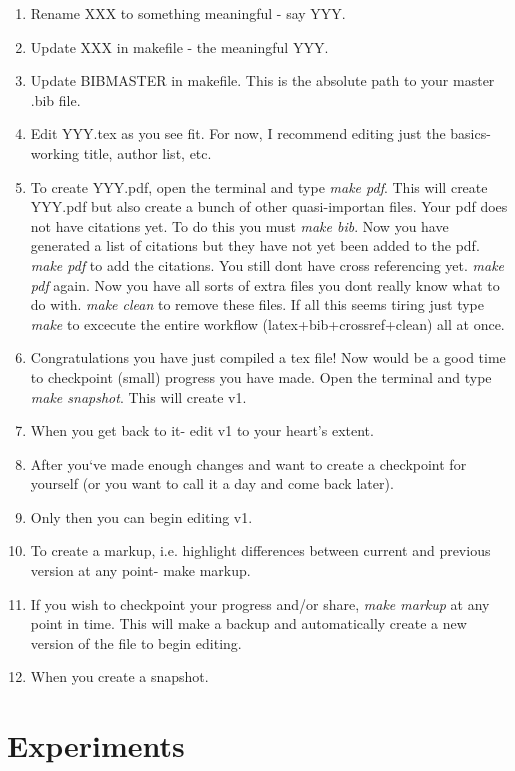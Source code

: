 \documentclass[preprint]{elsarticle}
\begin{document}
\begin{enumerate}[(1)]
\item Rename XXX to something meaningful - say YYY.
\item Update XXX in makefile - the meaningful YYY.
\item Update BIBMASTER in makefile. This is the absolute path to your master .bib file.
\item Edit YYY.tex as you see fit. For now, I recommend editing just the basics- working title, author list, etc.
\item To create YYY.pdf, open the terminal and type \emph{make pdf}. This will create YYY.pdf but also create a bunch of other quasi-importan files. Your pdf does not have citations yet. To do this you must \emph{make bib}. Now you have generated a list of citations but they have not yet been added to the pdf. \emph{make pdf} to add the citations. You still dont have cross referencing yet. \emph{make pdf} again. Now you have all sorts of extra files you dont really know what to do with. \emph{make clean} to remove these files. If all this seems tiring just type \emph{make} to excecute the entire workflow (latex+bib+crossref+clean) all at once.
\item Congratulations you have just compiled a tex file! Now would be a good time to checkpoint (small) progress you have made. Open the terminal and type \emph{make snapshot}. This will create v1.
\item When you get back to it- edit v1 to your heart's extent.
\item After you`ve made enough changes and want to create a checkpoint for yourself (or you want to call it a day and come back later). 
\item Only then you can begin editing v1.

\item To create a markup, i.e. highlight differences between current and previous version at any point- make markup. 
\item If you wish to checkpoint your progress and/or share, \emph{make markup} at any point in time. This will make a backup and automatically create a new version of the file to begin editing.
\item When you create a snapshot. 
\end{enumerate}

\section{Experiments}
\end{document}
